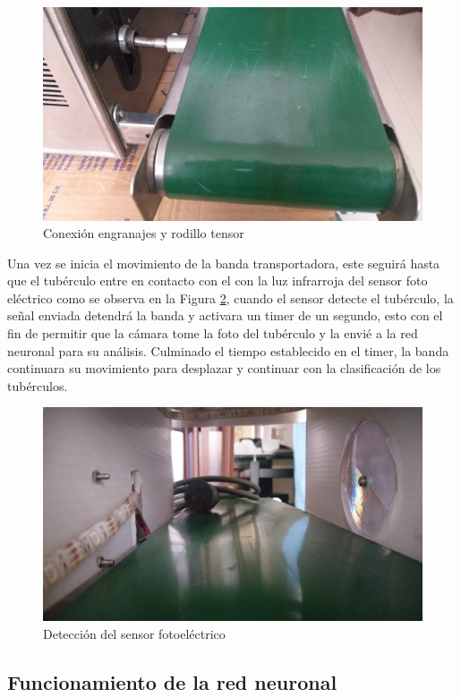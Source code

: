 		
		\begin{figure}[ht]
			\centering
			\includegraphics[scale=0.21]{Figs/202.jpg}
			\caption{Conexión engranajes y rodillo tensor}
			\label{fig:eje}
		\end{figure}

\newpage	
		Una vez se inicia el movimiento de la banda transportadora, este seguirá hasta que el tubérculo entre en contacto con el con la luz infrarroja del sensor foto eléctrico como se observa en la Figura \ref{fig:sensor}, cuando el sensor detecte el tubérculo, la señal enviada detendrá la banda y activara un timer de un segundo, esto con el fin de permitir que la cámara tome la foto del tubérculo y la envié a la red neuronal para su análisis. Culminado el tiempo establecido en el timer, la banda continuara su movimiento para desplazar y continuar con la clasificación de los tubérculos.
		
			\begin{figure}[ht]
			\centering
			\includegraphics[scale=0.23]{Figs/203.jpg}
			\caption{Detección del sensor fotoeléctrico}
			\label{fig:sensor}
			\end{figure}
	
\newpage
	\subsection{Funcionamiento de la red neuronal}		













